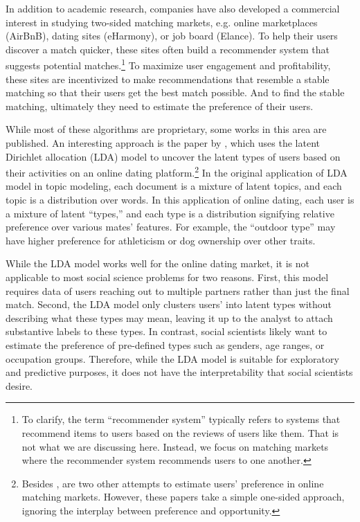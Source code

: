 In addition to academic research, companies have also developed a commercial
interest in studying two-sided matching markets, e.g. online marketplaces
(AirBnB), dating sites (eHarmony), or job board (Elance). To help their users
discover a match quicker, these sites often build a recommender system that
suggests potential matches.\footnote{To clarify, the term ``recommender system''
  typically refers to systems that recommend items to users based on the reviews
  of users like them. That is not what we are discussing here. Instead, we focus
  on matching markets where the recommender system recommends users to one
  another.} To maximize user engagement and profitability, these sites are
incentivized to make recommendations that resemble a stable matching so that
their users get the best match possible. And to find the stable matching,
ultimately they need to estimate the preference of their users.

While most of these algorithms are proprietary, some works in this area are
published. An interesting approach is the paper by \citet{Tu2014}, which uses
the latent Dirichlet allocation (LDA) model to uncover the latent types of users
based on their activities on an online dating platform.\footnote{Besides
  \citet{Tu2014}, \citet{Hitsch2010, Goswami2014} are two other attempts to
  estimate users' preference in online matching markets. However, these papers
  take a simple one-sided approach, ignoring the interplay between preference
  and opportunity.} In the original application of LDA model in topic modeling,
each document is a mixture of latent topics, and each topic is a distribution
over words. In this application of online dating, each user is a mixture of
latent ``types,'' and each type is a distribution signifying relative preference
over various mates' features. For example, the ``outdoor type'' may have higher
preference for athleticism or dog ownership over other traits.

While the LDA model works well for the online dating market, it is not
applicable to most social science problems for two reasons. First, this model
requires data of users reaching out to multiple partners rather than just the
final match. Second, the LDA model only clusters users' into latent types
without describing what these types may mean, leaving it up to the analyst to
attach substantive labels to these types. In contrast, social scientists likely
want to estimate the preference of pre-defined types such as genders, age
ranges, or occupation groups. Therefore, while the LDA model is suitable for
exploratory and predictive purposes, it does not have the interpretability that
social scientists desire.

